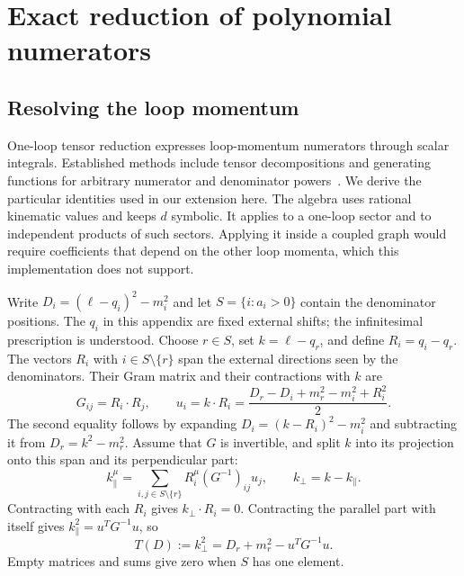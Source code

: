 \section{Exact reduction of polynomial numerators}
\label{app:notes-tensor-reduction}
\subsection{Resolving the loop momentum}
One-loop tensor reduction expresses loop-momentum numerators through scalar integrals. Established methods include tensor decompositions and generating functions for arbitrary numerator and denominator powers~\cite{DennerDittmaier2006,Hu2025}. We derive the particular identities used in our extension here. The algebra uses rational kinematic values and keeps $d$ symbolic. It applies to a one-loop sector and to independent products of such sectors. Applying it inside a coupled graph would require coefficients that depend on the other loop momenta, which this implementation does not support.

Write $D_i=(\ell-q_i)^2-m_i^2$ and let $S=\{i:a_i>0\}$ contain the denominator positions. The $q_i$ in this appendix are fixed external shifts; the infinitesimal prescription is understood. Choose $r\in S$, set $k=\ell-q_r$, and define $R_i=q_i-q_r$. The vectors $R_i$ with $i\in S\setminus\{r\}$ span the external directions seen by the denominators. Their Gram matrix and their contractions with $k$ are
\begin{equation}
 G_{ij}=R_i\cdot R_j,\qquad
 u_i=k\cdot R_i=\frac{D_r-D_i+m_r^2-m_i^2+R_i^2}{2}.
 \label{eq:notes-tensor-u}
\end{equation}
The second equality follows by expanding $D_i=(k-R_i)^2-m_i^2$ and subtracting it from $D_r=k^2-m_r^2$. Assume that $G$ is invertible, and split $k$ into its projection onto this span and its perpendicular part:
\begin{equation}
 k_\parallel^\mu=\sum_{i,j\in S\setminus\{r\}}R_i^\mu(G^{-1})_{ij}u_j,
 \qquad k_\perp=k-k_\parallel.
 \label{eq:notes-tensor-projection}
\end{equation}
Contracting with each $R_i$ gives $k_\perp\cdot R_i=0$. Contracting the parallel part with itself gives $k_\parallel^2=u^TG^{-1}u$, so
\begin{equation}
 T(D):=k_\perp^2=D_r+m_r^2-u^TG^{-1}u.
 \label{eq:notes-tensor-radius}
\end{equation}
Empty matrices and sums give zero when $S$ has one element.


